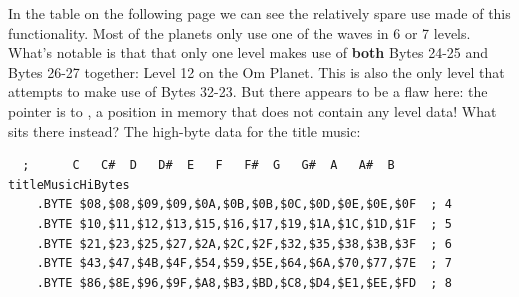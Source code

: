 In the table on the following page we can see the relatively spare use made of this functionality. Most of the
planets only use one of the waves in 6 or 7 levels. What's notable is that that only one level makes use of \textbf{both}
Bytes 24-25 and Bytes 26-27 together: Level 12 on the Om Planet. This is also the only level that attempts to make
use of Bytes 32-23. But there appears to be a flaw here: the pointer is to , a position in memory
that does not contain any level data! What sits there instead? The high-byte data for the title music:

\begin{lstlisting}
  ;      C   C#  D   D#  E   F   F#  G   G#  A   A#  B
titleMusicHiBytes   
	.BYTE $08,$08,$09,$09,$0A,$0B,$0B,$0C,$0D,$0E,$0E,$0F  ; 4
	.BYTE $10,$11,$12,$13,$15,$16,$17,$19,$1A,$1C,$1D,$1F  ; 5
	.BYTE $21,$23,$25,$27,$2A,$2C,$2F,$32,$35,$38,$3B,$3F  ; 6
	.BYTE $43,$47,$4B,$4F,$54,$59,$5E,$64,$6A,$70,$77,$7E  ; 7
	.BYTE $86,$8E,$96,$9F,$A8,$B3,$BD,$C8,$D4,$E1,$EE,$FD  ; 8

\end{lstlisting}

